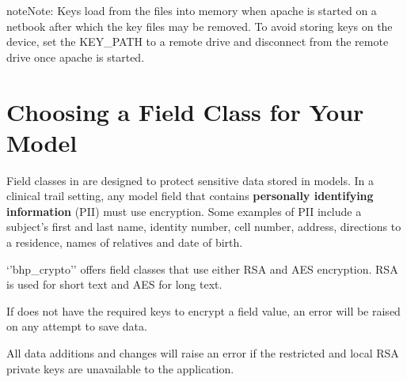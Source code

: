 \documentclass[letterpaper,10pt,english]{sphinxmanual}
\begin{document}
\begin{notice}{note}{Note:}
Keys load from the files into memory when apache is started on a netbook after which the key files may be removed. To avoid storing keys on the device, set the KEY\_PATH to a remote drive and disconnect from the remote drive once apache is started.
\end{notice}


\chapter{Choosing a Field Class for Your Model}
\label{selecting_field_classes:choosing-a-field-class-for-your-model}\label{selecting_field_classes::doc}
Field classes in  are designed to protect sensitive data stored in models. In a clinical trail setting, any
model field that contains \textbf{personally identifying information} (PII) must use encryption. Some examples of PII include a
subject's first and last name, identity number, cell number, address, directions to a residence, names of relatives and date of birth.

`'bhp\_crypto'' offers field classes that use either RSA and AES encryption. RSA is used for short text and AES for long text.

If  does not have the required keys to encrypt a field value, an error will be raised on any attempt to save data.

All data additions and changes will raise an error if the restricted and local RSA private keys are unavailable to the application.
\end{document}

